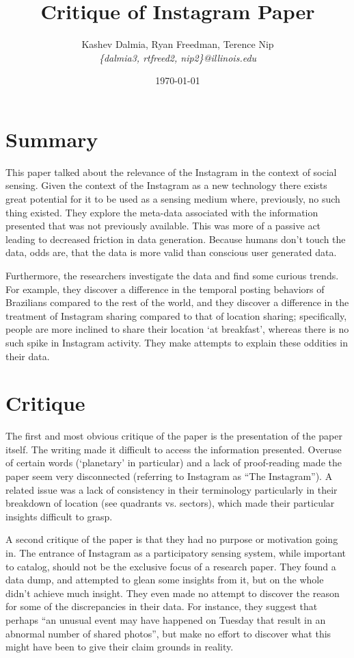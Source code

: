 \documentclass[a4paper]{article}
\title{Critique of Instagram Paper}
\author{Kashev Dalmia, Ryan Freedman, Terence Nip \\
        \textit{\{dalmia3, rtfreed2, nip2\}@illinois.edu}
       }
\date{\today}
\begin{document}
\maketitle

\section{Summary}

This paper talked about the relevance of the Instagram in the context of social
sensing. Given the context of the Instagram as a new technology there exists
great potential for it to be used as a sensing medium where, previously, no such
thing existed. They explore the meta-data associated with the information
presented that was not previously available. This was more of a passive act
leading to decreased friction in data generation. Because humans don't touch the
data, odds are, that the data is more valid than conscious user generated data.

Furthermore, the researchers investigate the data and find some curious trends.
For example, they discover a difference in the temporal posting behaviors of
Brazilians compared to the rest of the world, and they discover a difference in
the treatment of Instagram sharing compared to that of location sharing;
specifically, people are more inclined to share their location `at breakfast',
whereas there is no such spike in Instagram activity. They make attempts to
explain these oddities in their data.

\section{Critique}

The first and most obvious critique of the paper is the presentation of the
paper itself. The writing made it difficult to access the information presented.
Overuse of certain words (`planetary' in particular) and a lack of proof-reading
made the paper seem very disconnected (referring to Instagram as ``The
Instagram''). A related issue was a lack of consistency in their terminology
particularly in their breakdown of location (see quadrants vs. sectors), which
made their particular insights difficult to grasp.

A second critique of the paper is that they had no purpose or motivation going
in. The entrance of Instagram as a participatory sensing system, while important
to catalog, should not be the exclusive focus of a research paper. They found
a data dump, and attempted to glean some insights from it, but on the whole
didn't achieve much insight. They even made no attempt to discover the reason
for some of the discrepancies in their data. For instance, they suggest that
perhaps ``an unusual event may have happened on Tuesday that result in an
abnormal number of shared photos'', but make no effort to discover what this
might have been to give their claim grounds in reality.
\end{document}
